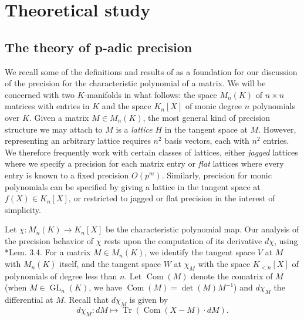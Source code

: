 \documentclass{sig-alternate-05-2015}
\DeclareMathOperator{\GL}{GL}
\DeclareMathOperator{\tr}{Tr}
\DeclareMathOperator{\com}{Com}
\begin{document}
\section{Theoretical study}
\label{sec:theo_study}

\subsection{The theory of p-adic precision} \label{sec:padicprec}

We recall some of the definitions and results of \cite{caruso-roe-vaccon:14a}
as a foundation for our discussion of the precision for the characteristic polynomial
of a matrix.  We will be concerned with two $K$-manifolds in what follows:
the space $M_n(K)$ of $n \times n$ matrices with entries in $K$ and the space
$K_n[X]$ of monic degree $n$ polynomials over $K$.  Given a matrix $M \in M_n(K)$,
the most general kind of precision structure we may attach to $M$ is a
\emph{lattice} $H$ in the tangent space at $M$.  However, representing an
arbitrary lattice requires $n^2$ basis vectors, each with $n^2$ entries.  We therefore
frequently work with certain classes of lattices, either \emph{jagged} lattices
where we specify a precision for each matrix entry or \emph{flat} lattices where
every entry is known to a fixed precision $O(p^m)$.  Similarly, precision for
monic polynomials can be specified by giving a lattice in the tangent space
at $f(X) \in K_n[X]$, or restricted to jagged or flat precision in the interest
of simplicity.

Let $\chi : M_n(K) \to K_n[X]$ be the characteristic polynomial map.
Our analysis of the precision behavior of $\chi$ rests upon
the computation of its derivative $d\chi$, using \cite{caruso-roe-vaccon:14a}*{Lem. 3.4}.
For a matrix $M \in M_n(K)$, we identify the tangent space $V$
at $M$ with $M_n(K)$ itself, and the tangent space $W$ at $\chi_M$ with
the space $K_{<n}[X]$ of polynomials of degree less than $n$.
Let $\com(M)$ denote the comatrix of $M$ (when $M \in \GL_n(K)$,
we have $\com(M) = \det(M) M^{-1}$) and $d\chi_M$ the differential at $M$.  Recall
that $d\chi_M$ is given by
\begin{equation} \label{eq:dchi}
d\chi_M: dM \mapsto \tr(\com(X-M) \cdot dM).
\end{equation}
\end{document}
